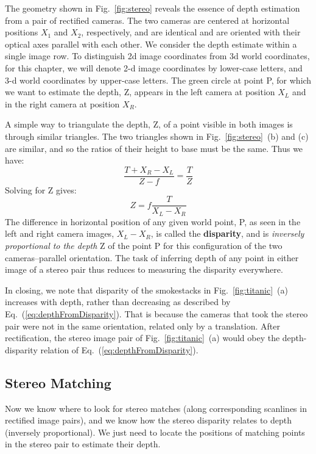 The geometry shown in Fig.~\ref{fig:stereo} reveals the essence of depth estimation from a pair of rectified cameras.   The two cameras are centered  at horizontal positions $X_1$ and $X_2$, respectively, and are identical and are oriented with their optical axes parallel with each other.  We consider the depth estimate within a single image row.  To distinguish 2d image coordinates from 3d world coordinates, for this chapter, we will denote 2-d image coordinates by lower-case letters, and 3-d world coordinates by upper-case letters. The green circle at point P, for which we want to estimate the depth, Z, appears in the left camera at position $X_L$ and in the right camera at position $X_R$.

A simple way to triangulate the depth, Z, of a point visible in both images is through similar triangles.  The two triangles shown in  Fig.~\ref{fig:stereo}~(b) and (c) are similar, and so the ratios of their height to base must be the same.  Thus we have:
\begin{equation}
    \frac{T+X_R-X_L}{Z-f} = \frac{T}{Z}
\end{equation}
Solving for Z gives:
\begin{equation}
    Z = f \frac{T}{X_L-X_R}
    \label{eq:depthFromDisparity}
\end{equation}
The difference in horizontal position of any given world point, P, as seen in the left and right camera images, $X_L - X_R$, is called the {\bf disparity}, and is {\em inversely proportional to the depth} Z of the point P for this configuration of the two cameras--parallel orientation.  The task of inferring depth of any point in either image of a stereo pair thus reduces to measuring the disparity everywhere.

In closing, we note that disparity of the smokestacks in Fig.~\ref{fig:titanic}~(a) increases with depth, rather than decreasing as described by Eq.~(\ref{eq:depthFromDisparity}).  That is because the cameras that took the stereo pair were not in the same orientation, related only by a translation.  After rectification, the stereo image pair of Fig.~\ref{fig:titanic}~(a) would obey the depth-disparity relation of Eq.~(\ref{eq:depthFromDisparity}).



\subsection{Stereo Matching}
Now we know where to look for stereo matches (along corresponding scanlines in rectified image pairs), and we know how the stereo disparity relates to depth (inversely proportional).  We just need to locate the positions of matching points in the stereo pair to estimate their depth.

